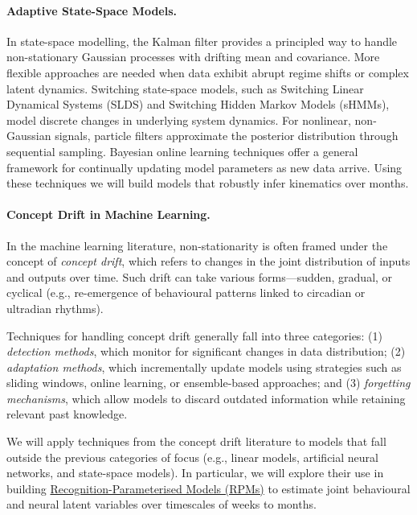 \paragraph{Adaptive State-Space Models.}

In state-space modelling, the Kalman filter provides a principled way to handle
non-stationary Gaussian processes with drifting mean and covariance. More
flexible approaches are needed when data exhibit abrupt regime shifts or
complex latent dynamics. Switching state-space models, such as Switching Linear
Dynamical Systems (SLDS) and Switching Hidden Markov Models (sHMMs), model
discrete changes in underlying system dynamics. For nonlinear, non-Gaussian
signals, particle filters approximate the posterior distribution through
sequential sampling. Bayesian online learning techniques offer a general
framework for continually updating model parameters as new data arrive.
%
Using these techniques we will build models that robustly infer kinematics
over months.

\paragraph{Concept Drift in Machine Learning.}

In the machine learning literature, non-stationarity is often framed under the
concept of \emph{concept drift}, which refers to changes in the joint
distribution of inputs and outputs over time. Such drift can take various
forms—sudden, gradual, or cyclical (e.g., re-emergence of behavioural patterns
linked to circadian or ultradian rhythms).

Techniques for handling concept drift generally fall into three categories: (1)
\emph{detection methods}, which monitor for significant changes in data
distribution; (2) \emph{adaptation methods}, which incrementally update models
using strategies such as sliding windows, online learning, or ensemble-based
approaches; and (3) \emph{forgetting mechanisms}, which allow models to discard
outdated information while retaining relevant past knowledge.

We will apply techniques from the concept drift literature to models that fall
outside the previous categories of focus (e.g., linear models, artificial neural
networks, and state-space models). In particular, we will explore their use in
building
\href{https://github.com/gatsby-sahani/rpm-aistats-2023}{Recognition-Parameterised
Models (RPMs)} to estimate joint behavioural and neural latent variables over
timescales of weeks to months.


